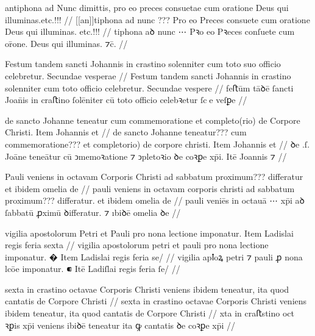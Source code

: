 \ex \bg
\gla
{}
antiphona ad Nunc dimittis, pro eo preces consuetae cum
oratione Deus qui illuminas.{etc.!!!}
//
\glRekonstrukcja
{}
[[an]]tiphona ad nunc {???} Pro eo Preces consuete cum
oratione Deus qui illuminas. {etc.!!!}
//
\glU
{}
tiphona aꝺ nunc ⋯ Pꝛo eo Pꝛeces conſuete cum or̄one. Deus qui illuminas. {⁊c̄}.
//
\endgl
\eg




\ex \bg
\gla
{}
Festum tandem sancti Johannis in crastino solenniter cum toto
suo officio celebretur. Secundae vesperae
//
\glRekonstrukcja
{}
Festum tandem sancti Johannis in crastino solenniter cum toto
{} officio celebretur. Secundae vespere
//
\glU
{}
feﬅūm tāꝺē ſancti Joan̄is in craﬅino ſolēniter cū toto {} oﬀicio celebꝛetur ſce veſꝑe
//
\endgl
\eg



\ex \bg
\gla
{}
de sancto Johanne teneatur
cum commemoratione et completo(rio) de Corpore Christi.
Item Johannis et
//
\glRekonstrukcja
{}
de sancto Johanne teneatur???
cum commemoratione??? et completorio) de corpore christi.
Item Johannis et
//
\glU
{}
ꝺe .ſ. Joāne teneātur cū ↄmemoꝛatione ⁊ ↄpletoꝛio ꝺe coꝛꝑe xp̄i. Itē Joannis ⁊
//
\endgl
\eg



\ex \bg
\gla
{}
Pauli veniens in octavam Corporis Christi ad
sabbatum proximum??? differatur et ibidem omelia de
//
\glRekonstrukcja
{}
pauli veniens in octavam corporis christi ad
sabbatum proximum??? differatur. et ibidem omelia de
//
\glU
{}
pauli veniēs in octauā ⋯ xp̄i aꝺ ſabbatū ꝓximū ꝺiﬀeratur. ⁊ ıbiꝺē omelia ꝺe
//
\endgl
\eg



\ex \bg
\gla
{}
vigilia apostolorum
Petri et Pauli pro nona lectione imponatur.
{} Item Ladislai regis feria sexta
//
\glRekonstrukcja
{}
vigilia apostolorum
petri et pauli pro nona lectione imponatur.
� Item Ladislai regis feria se/
//
\glU
{}
vigilia apꝉoꝝ petri ⁊ pauli ꝓ nona lcōe imponatur. ⁌ Itē Ladiſlai regis feria ſe/
//
\endgl
\eg



\ex \bg
\gla
{}
sexta in crastino octavae Corporis Christi
veniens ibidem teneatur, ita quod cantatis de Corpore Christi
//
\glRekonstrukcja
{}
sexta in crastino octavae Corporis Christi
veniens ibidem teneatur, ita quod cantatis de Corpore Christi
//
\glU
{}
xta in craﬅstino oct ꝛꝑis xp̄i veniens ibiꝺē teneatur ita ꝙ cantatis ꝺe coꝛꝑe xp̄i
//
\endgl
\eg




